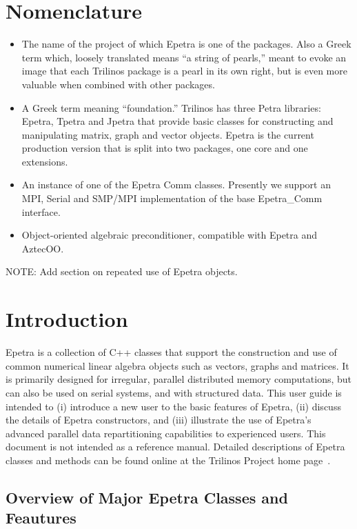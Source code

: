 \documentclass[12pt,relax]{EpetraUserGuide}
\newcommand{\comm}{Epetra\_Comm}
\begin{document}
\section*{Nomenclature}
\begin{itemize}
\item[Trilinos]
The name of the project of which Epetra is one of the packages.  Also a Greek term which,
loosely translated means ``a string of pearls,'' 
meant to evoke an image that each Trilinos package is a pearl in its 
own right, but is even more valuable when combined with other 
packages.
\item[Petra]
A Greek term meaning ``foundation.''  Trilinos has three Petra 
libraries: Epetra, Tpetra and Jpetra that provide basic classes 
for constructing and manipulating matrix, graph and vector
objects.  Epetra is the current production version that is
split into two packages, one core and one extensions.
\item[Comm Object]
An instance of one of the Epetra Comm classes.  Presently we support
an MPI, Serial and SMP/MPI implementation of the base \comm{} interface.
\item[Map Object] 
Object-oriented algebraic preconditioner, compatible with 
Epetra and AztecOO.
\end{itemize}

NOTE: Add section on repeated use of Epetra objects.


\section{Introduction}
\label{Section:Introduction}

Epetra is a collection of C++ classes that support the construction
and use of common numerical linear algebra objects such as vectors,
graphs and matrices.  It is primarily designed for irregular, parallel
distributed memory computations, but can also be used on serial
systems, and
with structured data.  This user guide is intended to (i) introduce a new
user to the basic features of Epetra, (ii) discuss the details of Epetra
constructors, and (iii) illustrate the use of
Epetra's advanced parallel data repartitioning capabilities to
experienced users.  This document is not intended as a reference
manual.  Detailed descriptions of Epetra classes and methods can be
found online at the Trilinos Project home page~\cite{Trilinos-home-page}.


\subsection{Overview of Major Epetra Classes and Feautures}
\end{document}
